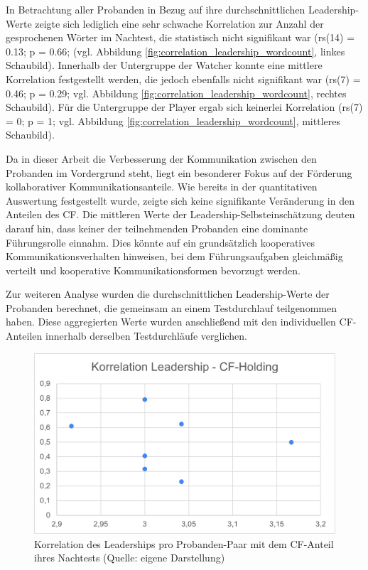 In Betrachtung aller Probanden in Bezug auf ihre durchschnittlichen Leadership-Werte zeigte sich lediglich eine sehr schwache Korrelation zur Anzahl der gesprochenen Wörter im Nachtest, die statistisch nicht signifikant war (rs(14) = 0.13; p = 0.66; (vgl. Abbildung \ref{fig:correlation_leadership_wordcount}, linkes Schaubild). Innerhalb der Untergruppe der Watcher konnte eine mittlere Korrelation festgestellt werden, die jedoch ebenfalls nicht signifikant war  (rs(7) = 0.46; p = 0.29; vgl. Abbildung \ref{fig:correlation_leadership_wordcount}, rechtes Schaubild). Für die Untergruppe der Player ergab sich keinerlei Korrelation (rs(7) = 0; p = 1; vgl. Abbildung \ref{fig:correlation_leadership_wordcount}, mittleres Schaubild).

Da in dieser Arbeit die Verbesserung der Kommunikation zwischen den Probanden im Vordergrund steht, liegt ein besonderer Fokus auf der Förderung kollaborativer Kommunikationsanteile. Wie bereits in der quantitativen Auswertung festgestellt wurde, zeigte sich keine signifikante Veränderung in den Anteilen des \ac{CF}. Die mittleren Werte der Leadership-Selbsteinschätzung deuten darauf hin, dass keiner der teilnehmenden Probanden eine dominante Führungsrolle einnahm. Dies könnte auf ein grundsätzlich kooperatives Kommunikationsverhalten hinweisen, bei dem Führungsaufgaben gleichmäßig verteilt und kooperative Kommunikationsformen bevorzugt werden.

Zur weiteren Analyse wurden die durchschnittlichen Leadership-Werte der Probanden berechnet, die gemeinsam an einem Testdurchlauf teilgenommen haben. Diese aggregierten Werte wurden anschließend mit den individuellen \ac{CF}-Anteilen innerhalb derselben Testdurchläufe verglichen.

\begin{figure}[ht]
\centering
\includegraphics[width=1\linewidth]{content/pictures/korrelation_leadership_cfh.png}
\caption{Korrelation des Leaderships pro Probanden-Paar mit dem \ac{CF}-Anteil ihres Nachtests (Quelle: eigene Darstellung)}
\label{fig:correlation_leadership_cfh}
\end{figure}

